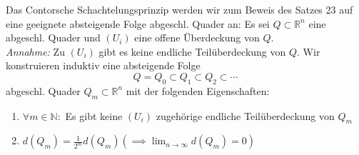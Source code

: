 Das Contorsche Schachtelungsprinzip werden wir zum Beweis des Satzes 23 auf eine geeignete absteigende
Folge abgeschl. Quader an: 
Es sei $ Q \subset \mathbb{R}^n  $ eine abgeschl. Quader und $ \left( U_{i} \right)  $ eine offene
Überdeckung von $ Q $. \\
\textit{Annahme: } Zu  $ \left( U_{i} \right)  $ gibt es keine endliche Teilüberdeckung von $ Q $. 
Wir konstruieren induktiv eine absteigende Folge $$ Q = Q_0 \subset Q_1 \subset Q_2 \subset \cdots $$ 
abgeschl. Quader $ Q_{m} \subset \mathbb{R}^n  $ mit der folgenden Eigenschaften:
\begin{enumerate}[label=\alph*)]
	\item $ \forall m \in  \mathbb{N} :  $ Es gibt keine $ \left( U_{i} \right)  $ zugehörige
		endliche Teilüberdeckung von $ Q_{m} $ 
	\item $ d \left( Q_{m} \right)  = \frac{1}{2^{m}} d \left( Q_{m} \right) \left( \implies 
		\lim_{n \to \infty} d \left( Q_{m} \right) = 0 \right) $ 
\end{enumerate}
	 



